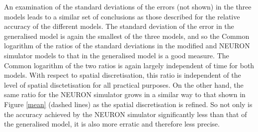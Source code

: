 An examination of the standard deviations of the errors (not
shown) in the three models leads to a similar set of conclusions
as those described for the relative accuracy of the different
models. The standard deviation of the error in the generalised
model is again the smallest of the three models, and so the Common
logarithm of the ratios of the standard deviations in the modified
and NEURON simulator models to that in the generalised model is a
good measure. The Common logarithm of the two ratios is again
largely independent of time for both models. With respect to
spatial discretisation, this ratio is independent of the level of
spatial disctetisation  for all practical purposes. On the other
hand, the same ratio for the NEURON simulator grows in a similar
way to that shown in Figure \ref{mean} (dashed lines) as the
spatial discretisation is refined. So not only is the accuracy
achieved by the NEURON simulator significantly less than that of
the generalised model, it is also more erratic and therefore less
precise.

